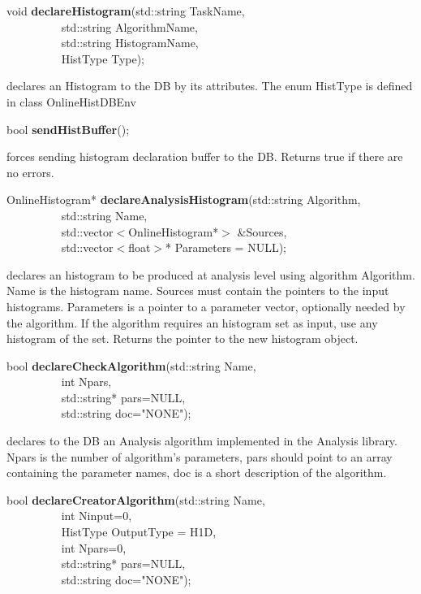 \item    void {\bf declareHistogram}(std::string TaskName,\\\mbox{}~~~~~~~~~
			std::string AlgorithmName,\\\mbox{}~~~~~~~~~
			std::string HistogramName,\\\mbox{}~~~~~~~~~
			HistType Type);

 declares an Histogram to the DB by its attributes.  The enum HistType is defined in class OnlineHistDBEnv


\item    bool {\bf sendHistBuffer}();


 forces sending histogram declaration buffer to the DB. Returns true if there are no errors.


\item    OnlineHistogram* {\bf declareAnalysisHistogram}(std::string Algorithm,\\\mbox{}~~~~~~~~~
					    std::string Name,\\\mbox{}~~~~~~~~~
					    std::vector$<$OnlineHistogram*$>$ \&Sources,\\\mbox{}~~~~~~~~~
					    std::vector$<$float$>$* Parameters = NULL);

 declares an histogram to be produced at analysis
 level using algorithm Algorithm. Name is the histogram name. Sources
 must contain the pointers to the input histograms. Parameters is a
 pointer to a parameter vector, optionally needed by the algorithm. If
 the algorithm requires an histogram set as input, use any histogram of the
 set. Returns the pointer to the new histogram object.


\item    bool {\bf declareCheckAlgorithm}(std::string Name,\\\mbox{}~~~~~~~~~ 
			     int Npars,\\\mbox{}~~~~~~~~~ 
			     std::string* pars=NULL,\\\mbox{}~~~~~~~~~ 
			     std::string doc="NONE");

 declares to the DB an Analysis algorithm implemented in the Analysis
 library. Npars is the number of algorithm's parameters, pars should
 point to an array containing the parameter names, doc is a short
 description of the algorithm.


\item    bool {\bf declareCreatorAlgorithm}(std::string Name,\\\mbox{}~~~~~~~~~ 
			       int Ninput=0,\\\mbox{}~~~~~~~~~ 
			       HistType OutputType = H1D,\\\mbox{}~~~~~~~~~
			       int Npars=0,\\\mbox{}~~~~~~~~~ 
			       std::string* pars=NULL,\\\mbox{}~~~~~~~~~
			       std::string doc="NONE");

